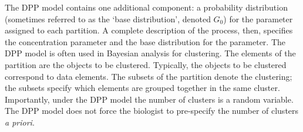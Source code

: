 \documentclass[11pt]{article}
\begin{document}
The DPP model contains one additional component: a probability distribution (sometimes referred to as the `base distribution', denoted $G_0$) for the parameter assigned to each partition.
A complete description of the process, then, specifies the concentration parameter and the base distribution for the parameter.
The DPP model is often used in Bayesian analysis for clustering.
The elements of the partition are the objects to be clustered.
Typically, the objects to be clustered correspond to data elements.
The subsets of the partition denote the clustering; the subsets specify which elements are grouped together in the same cluster.
Importantly, under the DPP model the number of clusters is a random variable.
The DPP model does not force the biologist to pre-specify the number of clusters {\it a priori}.

\end{document}
